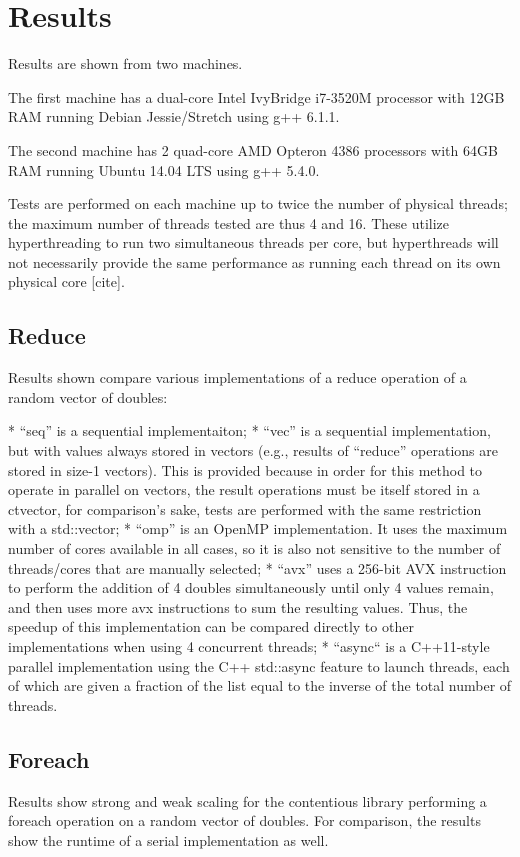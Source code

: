 \chapter{Results}

Results are shown from two machines.

The first machine has a dual-core Intel IvyBridge i7-3520M processor with 12GB
RAM running Debian Jessie/Stretch using g++ 6.1.1.

The second machine has 2 quad-core AMD Opteron 4386 processors with 64GB RAM
running Ubuntu 14.04 LTS using g++ 5.4.0.

Tests are performed on each machine up to twice the number of physical threads;
the maximum number of threads tested are thus 4 and 16. These utilize hyperthreading
to run two simultaneous threads per core, but hyperthreads will not necessarily
provide the same performance as running each thread on its own physical core [cite].



\section{Reduce}
Results shown compare various implementations of a reduce operation of a random
vector of doubles:

 * ``seq'' is a sequential implementaiton;
 * ``vec'' is a sequential implementation, but with values always stored in
 vectors (e.g., results of ``reduce'' operations are stored in size-1 vectors).
 This is provided because in order for this method to operate in parallel on
 vectors, the result operations must be itself stored in a ctvector, for
 comparison's sake, tests are performed with the same restriction with a
 std::vector;
 * ``omp'' is an OpenMP implementation. It uses the maximum number of cores
 available in all cases, so it is also not sensitive to the number of
 threads/cores that are manually selected;
 *  ``avx'' uses a 256-bit AVX instruction to perform the addition of 4 doubles
 simultaneously until only 4 values remain, and then uses more avx instructions
 to sum the resulting values. Thus, the speedup of this implementation can be
 compared directly to other implementations when using 4 concurrent threads;
 * ``async`` is a C++11-style parallel implementation using the C++ std::async
 feature to launch threads, each of which are given a fraction of the list equal
 to the inverse of the total number of threads.

\section{Foreach}
Results show strong and weak scaling for the contentious library performing a
foreach operation on a random vector of doubles. For comparison, the results
show the runtime of a serial implementation as well.

